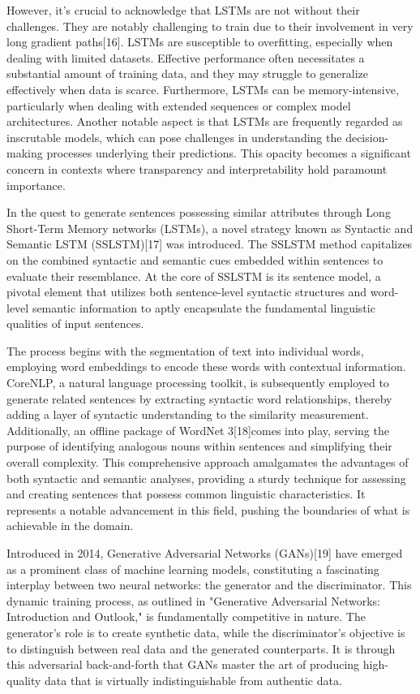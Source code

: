 \documentclass[fleqn,10pt]{thescipub} %
\begin{document}
However, it's crucial to acknowledge that LSTMs are not without their challenges. They are notably challenging to train due to their involvement in very long gradient paths[16]. LSTMs are susceptible to overfitting, especially when dealing with limited datasets. Effective performance often necessitates a substantial amount of training data, and they may struggle to generalize effectively when data is scarce. Furthermore, LSTMs can be memory-intensive, particularly when dealing with extended sequences or complex model architectures. Another notable aspect is that LSTMs are frequently regarded as inscrutable models, which can pose challenges in understanding the decision-making processes underlying their predictions. This opacity becomes a significant concern in contexts where transparency and interpretability hold paramount importance.



In the quest to generate sentences possessing similar attributes through Long Short-Term Memory networks (LSTMs), a novel strategy known as Syntactic and Semantic LSTM (SSLSTM)[17] was introduced. The SSLSTM method capitalizes on the combined syntactic and semantic cues embedded within sentences to evaluate their resemblance. At the core of SSLSTM is its sentence model, a pivotal element that utilizes both sentence-level syntactic structures and word-level semantic information to aptly encapsulate the fundamental linguistic qualities of input sentences.


The process begins with the segmentation of text into individual words, employing word embeddings to encode these words with contextual information. CoreNLP, a natural language processing toolkit, is subsequently employed to generate related sentences by extracting syntactic word relationships, thereby adding a layer of syntactic understanding to the similarity measurement. Additionally, an offline package of WordNet 3[18]comes into play, serving the purpose of identifying analogous nouns within sentences and simplifying their overall complexity. This comprehensive approach amalgamates the advantages of both syntactic and semantic analyses, providing a sturdy technique for assessing and creating sentences that possess common linguistic characteristics. It represents a notable advancement in this field, pushing the boundaries of what is achievable in the domain.



Introduced in 2014, Generative Adversarial Networks (GANs)[19] have emerged as a prominent class of machine learning models, constituting a fascinating interplay between two neural networks: the generator and the discriminator. This dynamic training process, as outlined in "Generative Adversarial Networks: Introduction and Outlook," is fundamentally competitive in nature. The generator's role is to create synthetic data, while the discriminator's objective is to distinguish between real data and the generated counterparts. It is through this adversarial back-and-forth that GANs master the art of producing high-quality data that is virtually indistinguishable from authentic data.
\end{document}
